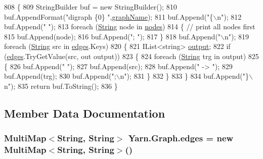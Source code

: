 \begin{DoxyCode}
808         \{
809             StringBuilder buf = \textcolor{keyword}{new} StringBuilder();
810             buf.AppendFormat(\textcolor{stringliteral}{"digraph \{0\} "},\hyperlink{a00110_a8605f1ec5a4e9cfd07d3ac2be042dac6}{graphName});
811             buf.Append(\textcolor{stringliteral}{"\{\(\backslash\)n"});
812             buf.Append(\textcolor{stringliteral}{"  "});
813             \textcolor{keywordflow}{foreach} (\hyperlink{a00053_a301aa7c866593a5b625a8fc158bbeacea27118326006d3829667a400ad23d5d98}{String} node \textcolor{keywordflow}{in} \hyperlink{a00110_a506df6f737a41748c01239bdea5d82b1}{nodes})
814             \{ \textcolor{comment}{// print all nodes first}
815                 buf.Append(node);
816                 buf.Append(\textcolor{stringliteral}{"; "});
817             \}
818             buf.Append(\textcolor{stringliteral}{"\(\backslash\)n"});
819             \textcolor{keywordflow}{foreach} (\hyperlink{a00053_a301aa7c866593a5b625a8fc158bbeacea27118326006d3829667a400ad23d5d98}{String} src \textcolor{keywordflow}{in} \hyperlink{a00110_a8adf7c937ab5c584b49698283e3da150}{edges}.Keys)
820             \{
821                 IList<string> \hyperlink{a00351_a3da6d48778c7b08a040bf24377f67792}{output};
822                 \textcolor{keywordflow}{if} (\hyperlink{a00110_a8adf7c937ab5c584b49698283e3da150}{edges}.TryGetValue(src, out output))
823                 \{
824                     \textcolor{keywordflow}{foreach} (\hyperlink{a00053_a301aa7c866593a5b625a8fc158bbeacea27118326006d3829667a400ad23d5d98}{String} trg \textcolor{keywordflow}{in} output)
825                     \{
826                         buf.Append(\textcolor{stringliteral}{"  "});
827                         buf.Append(src);
828                         buf.Append(\textcolor{stringliteral}{" -> "});
829                         buf.Append(trg);
830                         buf.Append(\textcolor{stringliteral}{";\(\backslash\)n"});
831                     \}
832                 \}
833             \}
834             buf.Append(\textcolor{stringliteral}{"\}\(\backslash\)n"});
835             \textcolor{keywordflow}{return} buf.ToString();
836         \}
\end{DoxyCode}


\subsection{Member Data Documentation}
\hypertarget{a00110_a8adf7c937ab5c584b49698283e3da150}{
\subsubsection[{edges}]{\setlength{\rightskip}{0pt plus 5cm}Multi\-Map$<${\bf String}, {\bf String}$>$ Yarn.\-Graph.\-edges = new Multi\-Map$<${\bf String}, {\bf String}$>$()}}\label{a00110_a8adf7c937ab5c584b49698283e3da150}


